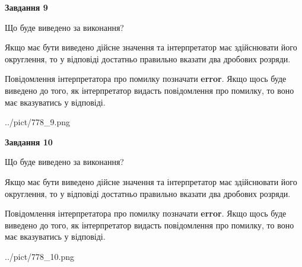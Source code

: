\documentclass[12pt, ukrainian]{article}
\begin{document}
{\begin {Large}
{\begin {center}\textbf{Завдання 9}\end {center}}\par
Що буде виведено за виконання? \par

Якщо має бути виведено дійсне значення та інтерпретатор має здійснювати його округлення, 
то у відповіді достатньо правильно вказати два дробових розряди.

Повідомлення інтерпретатора про помилку позначати \textbf{error}.
Якщо щось буде виведено до того, як інтерпретатор видасть повідомлення про помилку, 
то воно має вказуватись у відповіді. \par

\begin{center}
	{../pict/778_9.png}
\end{center}
\newpage

{\begin {center}\textbf{Завдання 10}\end {center}}\par
Що буде виведено за виконання? \par

Якщо має бути виведено дійсне значення та інтерпретатор має здійснювати його округлення, 
то у відповіді достатньо правильно вказати два дробових розряди.

Повідомлення інтерпретатора про помилку позначати \textbf{error}.
Якщо щось буде виведено до того, як інтерпретатор видасть повідомлення про помилку, 
то воно має вказуватись у відповіді. \par

\begin{center}
	{../pict/778_10.png}
\end{center}
\newpage

\end {Large}}
\end{document}
